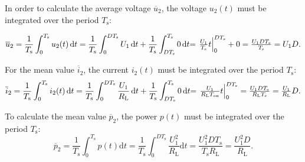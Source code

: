\begin{solutionblock}
In order to calculate the average voltage $\overline u_2$, the voltage $u_{\mathrm{2}}(t)$ must be integrated over the period $T_{\mathrm{s}}$:

\begin{equation}
    \overline u_2 = \frac{1}{T_{\mathrm{s}}} \int_0^{ T_{\mathrm{s}}} u_2 (t) \, \mathrm{d}t = \frac{1}{ T_{\mathrm{s}}} \int_0^{D T_{\mathrm{s}}} U_1 \, \mathrm{d}t + \frac{1}{ T_{\mathrm{s}}} \int_{D  T_{\mathrm{s}}}^{ T_{\mathrm{s}}} 0 \, \mathrm{d}t$$
    $$= \left . \frac{U_1}{ T_{\mathrm{s}}} t \right |_0^{D  T_{\mathrm{s}}}  + 0 = \frac{U_1 D  T_{\mathrm{s}}}{ T_{\mathrm{s}}} = U_1 D.
\end{equation}

For the mean value $\overline i_2$, the current $i_{\mathrm{2}}(t)$ must be integrated over the period $T_{\mathrm{s}}$:
\begin{equation}
    \overline i_2 = \frac{1}{ T_{\mathrm{s}}} \int_0^{ T_{\mathrm{s}}} i_2(t) \, \mathrm{d}t = \frac{1}{ T_{\mathrm{s}}}\int_0^{D  T_{\mathrm{s}}} \frac{U_1}{ R_{\mathrm{L}}} \, \mathrm{d}t + \frac{1}{ T_{\mathrm{s}}}\int_{D  T_{\mathrm{s}}}^{ T_{\mathrm{s}}} 0 \, \mathrm{d}t$$
    $$= \left . \frac{U_1}{ R_{\mathrm{L}}  T_{\mathrm{on}}}  t \right |_0^{D  T_{\mathrm{s}}} = \frac{U_1 D  T_{\mathrm{s}}}{ R_{\mathrm{L}}  T_{\mathrm{s}}} = \frac{U_1}{ R_{\mathrm{L}}} D.
\end{equation}

To calculate the mean value $\overline{p}_{\mathrm{2}}$, the power $p(t)$ must be integrated over the period $T_{\mathrm{s}}$:
\begin{equation}
    \overline{p}_{\mathrm{2}} = \frac{1}{T_{\mathrm{s}}} \int_0^{T_{\mathrm{s}}} p(t) \mathrm{d}t = \frac{1}{T_{\mathrm{s}}} \int_0^{D T_{\mathrm{s}}} \frac{U_1^2}{ R_{\mathrm{L}}} \mathrm{d}t = \frac{U_1^2 D T_{\mathrm{s}}}{ T_{\mathrm{s}}  R_{\mathrm{L}}} = \frac{U_1^2 D}{ R_{\mathrm{L}}}.
\end{equation}
\end{solutionblock}



